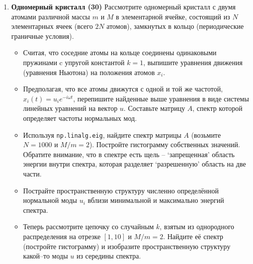 \documentclass[prb,papersize=a4paper,notitlepage]{revtex4-1}%
\begin{document}
\begin{enumerate}
\item \textbf{Одномерный кристалл (30)} Рассмотрите одномерный кристалл с двумя атомами различной массы $m$ и $M$ в элементарной ячейке, состоящий из $N$ элементарных ячеек (всего $2N$ атомов), замкнутых в кольцо (периодические граничные условия).  
\begin{itemize}
\item Считая, что соседние атомы на кольце соединены одинаковыми пружинами c упругой константой $k=1$, выпишите уравнения движения (уравнения Ньютона) на положения атомов $x_i$. 
\item Предполагая, что все атомы движутся с одной и той же частотой, $x_i(t)=u_i e^{-i\omega t}$, перепишите найденные выше уравнения в виде системы линейных уравнений на вектор $u$. Составьте матрицу $A$, спектр которой определяет частоты нормальных мод.
\item Используя \lstinline{np.linalg.eig}, найдите спектр матрицы $A$ (возьмите $N = 1000$ и $M/m = 2$). Постройте гистограмму собственных значений. Обратите внимание, что в спектре есть щель -- `запрещенная'  область энергии внутри спектра, которая разделяет `разрешенную' область на две части.
\item Пострайте пространственную структуру численно определённой нормальной моды $u_i$ вблизи минимальной и максимально энергий спектра. 
\item Теперь рассмотрите цепочку со случайным $k$, взятым из однородного распределения на отрезке $\left[1, 10\right]$ и $M/m = 2$. Найдите её спектр (постройте гистограмму) и изобразите пространственную структуру какой--то моды $u$ из середины спектра.
\end{itemize}
\end{enumerate} 
\end{document}
